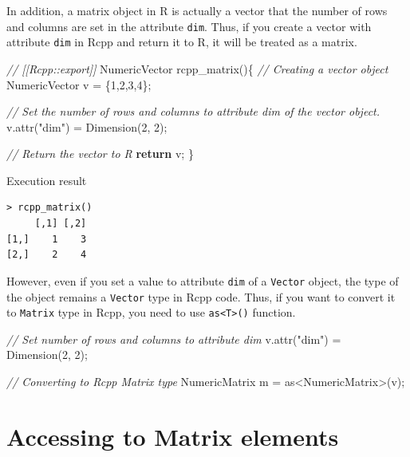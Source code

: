 \documentclass[]{book}
\newenvironment{Shaded}{\begin{snugshade}}{\end{snugshade}}
\newcommand{\CommentTok}[1]{\textcolor[rgb]{0.56,0.35,0.01}{\textit{#1}}}
\newcommand{\ControlFlowTok}[1]{\textcolor[rgb]{0.13,0.29,0.53}{\textbf{#1}}}
\newcommand{\DecValTok}[1]{\textcolor[rgb]{0.00,0.00,0.81}{#1}}
\newcommand{\NormalTok}[1]{#1}
\newcommand{\StringTok}[1]{\textcolor[rgb]{0.31,0.60,0.02}{#1}}
\begin{document}
In addition, a matrix object in R is actually a vector that the number of rows and columns are set in the attribute \texttt{dim}. Thus, if you create a vector with attribute \texttt{dim} in Rcpp and return it to R, it will be treated as a matrix.

\begin{Shaded}
\begin{Highlighting}[]
\CommentTok{// [[Rcpp::export]]}
\NormalTok{NumericVector rcpp_matrix()\{}
    \CommentTok{// Creating a vector object}
\NormalTok{    NumericVector v = \{}\DecValTok{1}\NormalTok{,}\DecValTok{2}\NormalTok{,}\DecValTok{3}\NormalTok{,}\DecValTok{4}\NormalTok{\};}

    \CommentTok{// Set the number of rows and columns to attribute dim of the vector object.}
\NormalTok{    v.attr(}\StringTok{"dim"}\NormalTok{) = Dimension(}\DecValTok{2}\NormalTok{, }\DecValTok{2}\NormalTok{);}

    \CommentTok{// Return the vector to R}
    \ControlFlowTok{return}\NormalTok{ v;}
\NormalTok{\}}
\end{Highlighting}
\end{Shaded}

Execution result

\begin{verbatim}
> rcpp_matrix()
     [,1] [,2]
[1,]    1    3
[2,]    2    4
\end{verbatim}

However, even if you set a value to attribute \texttt{dim} of a \texttt{Vector} object, the type of the object remains a \texttt{Vector} type in Rcpp code. Thus, if you want to convert it to \texttt{Matrix} type in Rcpp, you need to use \texttt{as\textless{}T\textgreater{}()} function.

\begin{Shaded}
\begin{Highlighting}[]
\CommentTok{// Set number of rows and columns to attribute dim}
\NormalTok{v.attr(}\StringTok{"dim"}\NormalTok{) = Dimension(}\DecValTok{2}\NormalTok{, }\DecValTok{2}\NormalTok{);}

\CommentTok{// Converting to Rcpp Matrix type}
\NormalTok{NumericMatrix m = as<NumericMatrix>(v);}
\end{Highlighting}
\end{Shaded}

\hypertarget{accessing-to-matrix-elements}{%
\section{Accessing to Matrix elements}\label{accessing-to-matrix-elements}}
\end{document}

